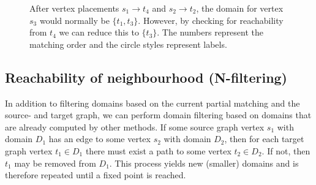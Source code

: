 \begin{figure}
\centering
\parbox{1.2in}{

}
\qquad\qquad
\begin{minipage}{1.2in}%

\end{minipage}
\caption{After vertex placements $s_1 \to t_4$ and $s_2 \to t_2$, the domain for vertex $s_3$ would normally be $\{t_1, t_3\}$. However, by checking for reachability from $t_4$ we can reduce this to $\{t_3\}$. The numbers represent the matching order and the circle styles represent labels.}
\label{fig:reachability-filtered}
\end{figure}
\subsection{Reachability of neighbourhood \hspace{12pt}(N-filtering)}
In addition to filtering domains based on the current partial matching and the source- and target graph, we can perform domain filtering based on domains that are already computed by other methods. If some source graph vertex $s_1$ with domain $D_1$ has an edge to some vertex $s_2$ with domain $D_2$, then for each target graph vertex $t_1 \in D_1$ there must exist a path to some vertex $t_2 \in D_2$. If not, then $t_1$ may be removed from $D_1$. This process yields new (smaller) domains and is therefore repeated until a fixed point is reached.


